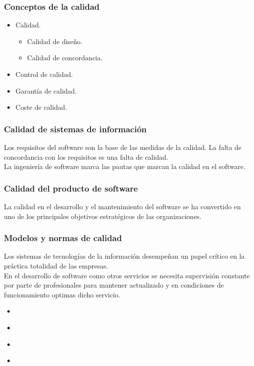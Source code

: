 \documentclass[12pt,twoside]{article}
\begin{document}
\subsubsection{Conceptos de la calidad}
\begin{itemize}
    \item Calidad.
    \begin{itemize}
        \item Calidad de diseño.
        \item Calidad de concordancia.
    \end{itemize}
    \item Control de calidad.
    \item Garantía de calidad.
    \item Coste de calidad.
\end{itemize}
\subsubsection{Calidad de sistemas de información}
Los requisitos del software son la base de las medidas de la calidad. La falta de 
concordancia con los requisitos es una falta de calidad.\\
La ingeniería de software marca las pautas que marcan la calidad en el software.\\
\subsubsection{Calidad del producto de software}
La calidad en el desarrollo y el mantenimiento del software se ha convertido en uno 
de los principales objetivos estratégicos de las organizaciones. \\
\subsubsection{Modelos y normas de calidad}
Los sistemas de tecnologías de la información desempeñan un papel crítico en la 
práctica totalidad de las empresas.\\
En el desarrollo de software como otros servicios se necesita supervisión constante 
por parte de profesionales para mantener actualizado y en condiciones de 
funcionamiento optimas dicho servicio.\\
\begin{itemize}
    \item \textbf{}
    \item \textbf{}
    \item \textbf{}
    \item \textbf{}
    
\end{itemize}



\end{document}
